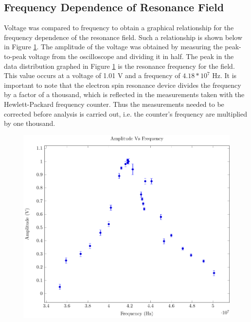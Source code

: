 \documentclass[a4paper]{article}
\begin{document}
\subsection{Frequency Dependence of Resonance Field}

\qq Voltage was compared to frequency to obtain a graphical
relationship for the frequency dependence of the resonance field. Such a relationship is shown below in Figure \ref{FrequencyDependence}.
The amplitude of the voltage was obtained by measuring the peak-to-peak voltage from the oscilloscope and dividing it in half. The peak in the data distribution graphed in Figure \ref{FrequencyDependence} is the resonance frequency for the
field. This value occurs at a voltage of 1.01 V and a frequency of
$4.18*10^7$ Hz. It is important to note that the electron spin
resonance device divides the frequency by a factor of a thousand, which is reflected in the measurements taken with the
 Hewlett-Packard frequency counter. Thus the measurements needed to be corrected before analysis is carried out, i.e. the
counter's frequency are multiplied by one thousand.

\begin{figure}[H]
\centering
\includegraphics[width=1\textwidth]{Plots/ExpFreqVsVolt/freq_depen.pdf}
\label{FrequencyDependence}
\end{figure}
\end{document}
